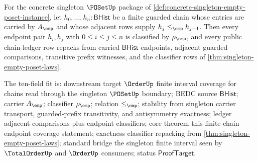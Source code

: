 \begin{theorem}
\label{thm:poset-prefix-finite-chain-endpoint-classifier-coverage}
For the concrete singleton $\POSetUp$ package of
\autoref{def:concrete-singleton-empty-poset-instance}, let
$h_0,\ldots,h_n:\mathsf{BHist}$ be a finite guarded chain whose entries are
carried by $A_{\emp}$ and whose adjacent rows supply
$h_j\le_{\emp}h_{j+1}$. Then every endpoint pair $h_i,h_j$ with
$0\le i\le j\le n$ is classified by $\rho_{\emp}$, and every public
chain-ledger row repacks from carried $\mathsf{BHist}$ endpoints, adjacent
guarded comparisons, transitive prefix witnesses, and the classifier rows of
\autoref{thm:singleton-empty-poset-laws}.

The ten-field fit is: downstream target $\OrderUp$ finite interval coverage
for chains read through the singleton $\POSetUp$ boundary; BEDC source
$\mathsf{BHist}$; carrier $A_{\emp}$; classifier $\rho_{\emp}$; relation
$\le_{\emp}$; stability from singleton carrier transport, guarded-prefix
transitivity, and antisymmetry exactness; ledger adjacent comparisons plus
endpoint classifiers; core theorem this finite-chain endpoint coverage
statement; exactness classifier repacking from
\autoref{thm:singleton-empty-poset-laws}; standard bridge the singleton
finite interval seen by $\TotalOrderUp$ and $\OrderUp$ consumers; status
$\mathsf{ProofTarget}$.
\end{theorem}
